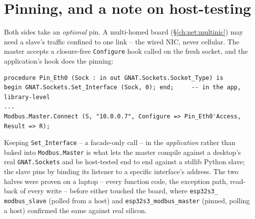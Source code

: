 \section{Pinning, and a note on host-testing}

Both sides take an \emph{optional} pin. A multi-homed board (\S\ref{ch:net:multinic})
may need a slave's traffic confined to one link -- the wired NIC, never cellular. The
master accepts a closure-free \texttt{Configure} hook called on the fresh socket, and
the application's hook does the pinning:

\begin{lstlisting}
procedure Pin_Eth0 (Sock : in out GNAT.Sockets.Socket_Type) is
begin GNAT.Sockets.Set_Interface (Sock, 0); end;     -- in the app, library-level
...
Modbus.Master.Connect (S, "10.0.0.7", Configure => Pin_Eth0'Access, Result => R);
\end{lstlisting}

Keeping \texttt{Set\_Interface} -- a facade-only call -- in the \emph{application}
rather than baked into \texttt{Modbus.Master} is what lets the master compile against a
desktop's real \texttt{GNAT.Sockets} and be host-tested end to end against a stdlib
Python slave; the slave pins by binding its listener to a specific interface's address.
The two halves were proven on a laptop -- every function code, the exception path,
read-back of every write -- before either touched the board, where \texttt{esp32s3\_%
modbus\_slave} (polled from a host) and \texttt{esp32s3\_modbus\_master} (pinned, polling
a host) confirmed the same against real silicon.
